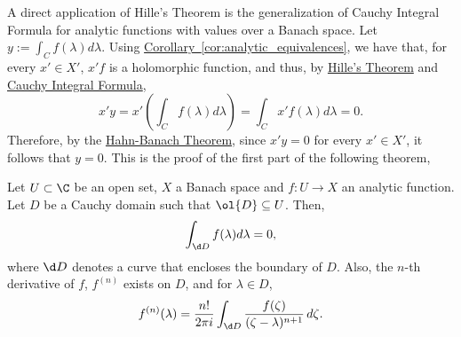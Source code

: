 A direct application of Hille's Theorem is the generalization of Cauchy Integral Formula for analytic functions with values over a Banach space. Let $y:= \int_{C} f(\lambda) d\lambda$. Using \hyperref[cor:analytic_equivalences]{Corollary~\ref*{cor:analytic_equivalences}}, we have that, for every $x' \in X'$, $x'f$ is a holomorphic function, and thus, by \hyperref[thm:hille]{Hille's Theorem} and \hyperref[thm:cauchy_integral_formula_basic]{Cauchy Integral Formula},
\[ x'y = x'\left( \int_{C} f(\lambda) d\lambda \right) = \int_{C} x'f(\lambda) d\lambda = 0. \]
Therefore, by the \hyperref[lem:hahn_banach_thm]{Hahn-Banach Theorem}, since $x'y = 0$ for every $x'\in X'$, it follows that $y = 0$. This is the proof of the first part of the following theorem,

\begin{theorem}\label{cauchy_integral_formula} 
    Let $U\subset \C$ be an open set, $X$ a Banach space and $f:U\to X$ an analytic function. Let $D$ be a Cauchy domain such that $\ol{D} \subseteq U$. Then,
    \[ \int_{\d D} f(\lambda) d\lambda = 0, \]
    where $\d D$ denotes a curve that encloses the boundary of $D$. Also, the $n$-th derivative of $f$, $f^{(n)}$ exists on $D$, and for $\lambda \in D$,
    \[ f^{(n)}(\lambda) = \frac{n!}{2\pi i} \int_{\d D} \frac{f(\zeta)}{(\zeta - \lambda)^{n+1}} \, d\zeta. \] 
\end{theorem}


